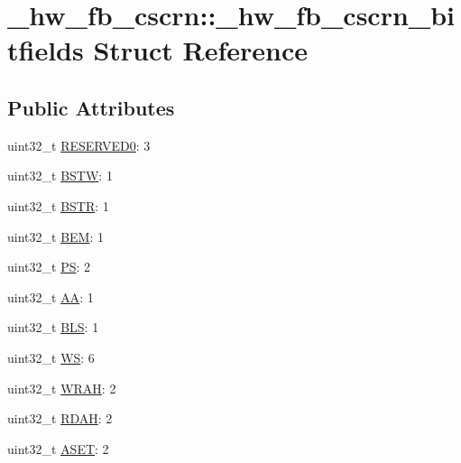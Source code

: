 \hypertarget{struct__hw__fb__cscrn_1_1__hw__fb__cscrn__bitfields}{}\section{\+\_\+hw\+\_\+fb\+\_\+cscrn\+:\+:\+\_\+hw\+\_\+fb\+\_\+cscrn\+\_\+bitfields Struct Reference}
\label{struct__hw__fb__cscrn_1_1__hw__fb__cscrn__bitfields}
\subsection*{Public Attributes}
\begin{DoxyCompactItemize}
\item 
uint32\+\_\+t \hyperlink{struct__hw__fb__cscrn_1_1__hw__fb__cscrn__bitfields_afdf973fb2b2b6c3e9187a0ccf21bfd25}{R\+E\+S\+E\+R\+V\+E\+D0}\+: 3
\item 
uint32\+\_\+t \hyperlink{struct__hw__fb__cscrn_1_1__hw__fb__cscrn__bitfields_a64259244da2cb4853bebcce6f9f5f189}{B\+S\+TW}\+: 1
\item 
uint32\+\_\+t \hyperlink{struct__hw__fb__cscrn_1_1__hw__fb__cscrn__bitfields_a38a8453c8196be73e7b6bfe8b5264e45}{B\+S\+TR}\+: 1
\item 
uint32\+\_\+t \hyperlink{struct__hw__fb__cscrn_1_1__hw__fb__cscrn__bitfields_a8a3162d791de95213a797d207d8cb888}{B\+EM}\+: 1
\item 
uint32\+\_\+t \hyperlink{struct__hw__fb__cscrn_1_1__hw__fb__cscrn__bitfields_a3e69a1922feb3e317e0600da604ceaf0}{PS}\+: 2
\item 
uint32\+\_\+t \hyperlink{struct__hw__fb__cscrn_1_1__hw__fb__cscrn__bitfields_a01d5d7c564c88f4664932fa6cc1558bd}{AA}\+: 1
\item 
uint32\+\_\+t \hyperlink{struct__hw__fb__cscrn_1_1__hw__fb__cscrn__bitfields_ab76082cb4cde0e809abe75aa973d867f}{B\+LS}\+: 1
\item 
uint32\+\_\+t \hyperlink{struct__hw__fb__cscrn_1_1__hw__fb__cscrn__bitfields_aab78719a778d5b98bf3d072afd04ab7a}{WS}\+: 6
\item 
uint32\+\_\+t \hyperlink{struct__hw__fb__cscrn_1_1__hw__fb__cscrn__bitfields_a47fe42184cd44c3722021e1d24f55993}{W\+R\+AH}\+: 2
\item 
uint32\+\_\+t \hyperlink{struct__hw__fb__cscrn_1_1__hw__fb__cscrn__bitfields_a8085d1666534c19cb4894217345a531d}{R\+D\+AH}\+: 2
\item 
uint32\+\_\+t \hyperlink{struct__hw__fb__cscrn_1_1__hw__fb__cscrn__bitfields_a3e5d35f3fcf5aca7380cdc1b9558ecd5}{A\+S\+ET}\+: 2

\end{DoxyCompactItemize}
